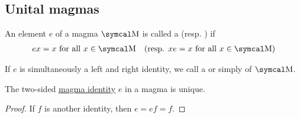 \subsection{Unital magmas}\label{subsec:unital_magmas}

\begin{definition}\label{def:magma_identity}
  An element \( e \) of a magma \( \CM \) is called a  (resp. ) if
  \begin{align}\label{eq:def:magma_identity}
    ex = x \T{for all} x \in \CM
    &&
    (\text{resp. } xe = x \T{for all} x \in \CM)
  \end{align}

  If \( e \) is simultaneously a left and right identity, we call a  or simply  of \( \CM \).
\end{definition}

\begin{proposition}\label{thm:magma_identity_unique}
  The two-sided \hyperref[def:magma_identity]{magma identity} \( e \) in a magma is unique.
\end{proposition}
\begin{proof}
  If \( f \) is another identity, then \( e = ef = f \).
\end{proof}

